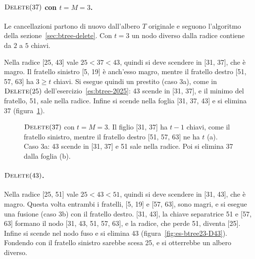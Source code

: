 \paragraph{$\textsc{Delete}(37)$ con $t = M = 3$.}
Le cancellazioni partono di nuovo dall'albero $T$ originale e seguono l'algoritmo della sezione~\ref{sec:btree-delete}. Con $t = 3$ un nodo diverso dalla radice contiene da $2$ a $5$ chiavi.

Nella radice [25, 43] vale $25 < 37 < 43$, quindi si deve scendere in [31, 37], che è magro. Il fratello sinistro [5, 19] è anch'esso magro, mentre il fratello destro [51, 57, 63] ha $3 \ge t$ chiavi. Si esegue quindi un prestito (caso 3a), come in $\textsc{Delete}(25)$ dell'esercizio~\ref{es:btree-2025}: 43 scende in [31, 37], e il minimo del fratello, 51, sale nella radice. Infine si scende nella foglia [31, 37, 43] e si elimina 37 (figura~\ref{fig:es-btree23-D37}).

\begin{figure}[htbp]
\centering
{}
\caption{$\textsc{Delete}(37)$ con $t = M = 3$. Il figlio [31, 37] ha $t-1$ chiavi, come il fratello sinistro, mentre il fratello destro [51, 57, 63] ne ha $t$ (a). Caso 3a: 43 scende in [31, 37] e 51 sale nella radice. Poi si elimina 37 dalla foglia (b).}
\label{fig:es-btree23-D37}
\end{figure}

\paragraph{$\textsc{Delete}(43)$.}
Nella radice [25, 51] vale $25 < 43 < 51$, quindi si deve scendere in [31, 43], che è magro. Questa volta entrambi i fratelli, [5, 19] e [57, 63], sono magri, e si esegue una fusione (caso 3b) con il fratello destro. [31, 43], la chiave separatrice 51 e [57, 63] formano il nodo [31, 43, 51, 57, 63], e la radice, che perde 51, diventa [25]. Infine si scende nel nodo fuso e si elimina 43 (figura~\ref{fig:es-btree23-D43}). Fondendo con il fratello sinistro sarebbe scesa 25, e si otterrebbe un albero diverso.

